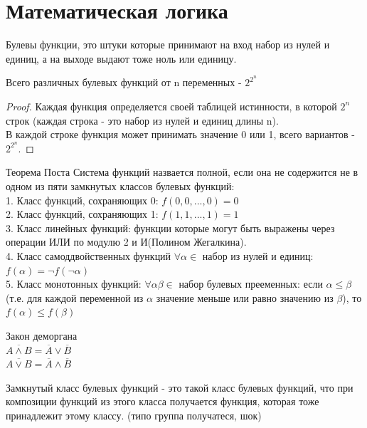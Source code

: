 \lecturedate{\today}

\section{Математическая логика}

Булевы функции, это штуки которые принимают на вход набор из нулей и единиц, а на выходе выдают тоже ноль или единицу.
\begin{theorem}
  Всего различных булевых функций от n переменных - $2^{2^n}$
\end{theorem}
\begin{proof}
  Каждая функция определяется своей таблицей истинности, в которой $2^n$ строк (каждая строка - это набор из нулей и единиц длины n). \\
  В каждой строке функция может принимать значение 0 или 1, всего вариантов - $2^{2^n}$.
\end{proof}
\begin{theorem}{Теорема Поста}
Система функций назвается полной, если она не содержится не в одном из пяти замкнутых классов булевых функций: \\
1. Класс функций, сохраняющих 0: $f(0, 0, ..., 0) = 0$ \\
2. Класс функций, сохраняющих 1: $f(1, 1, ..., 1) = 1$ \\
3. Класс линейных функций: функции которые могут быть выражены через операции ИЛИ по модулю 2 и И(Полином Жегалкина). \\
4. Класс самоддвойственных функций $\forall \alpha \in$ набор из нулей и единиц: $f(\alpha) = ¬f(\neg \alpha)$\\
5. Класс монотонных функций: $\forall \alpha \beta \in$ набор булевых прееменных: если $\alpha \leq \beta$ (т.е. для каждой переменной из $\alpha$ значение меньше или равно значению из $\beta$), то $f(\alpha) \leq f(\beta)$ \\
\end{theorem}
\begin{definition}{Закон деморгана}
  \\
  $\overline{A \land B} = \overline{A} \lor \overline{B}$ \\
  $\overline{A \lor B} = \overline{A} \land \overline{B}$
\end{definition}
\begin{definition}
  Замкнутый класс булевых функций - это такой класс булевых функций, что при композиции функций из этого класса получается функция, которая тоже принадлежит этому классу. (типо группа получатеся, шок)
\end{definition}

